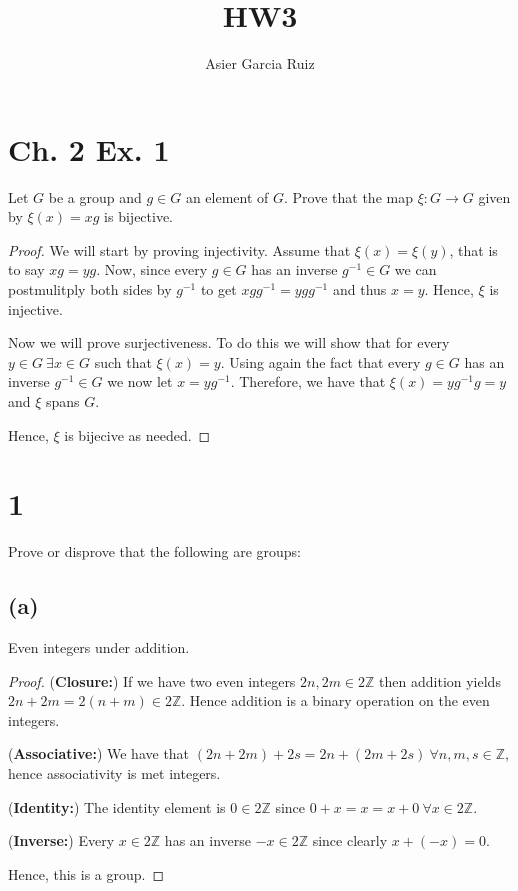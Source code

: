\documentclass{article}
\title{HW3}
\author{Asier Garcia Ruiz}
\newcommand{\Z}{\mathbb{Z}}
\begin{document}
\maketitle

\section*{Ch. 2 Ex. 1}
Let $G$ be a group and $g \in G$ an element of $G$. Prove that the map $\xi: G\to G$ given by $\xi(x) = xg$ is bijective.

\begin{proof}
    We will start by proving injectivity. Assume that $\xi(x) = \xi(y)$, that is to say
    $xg = yg$. Now, since every $g\in G$ has an inverse $g^{-1} \in G$ we can postmulitply
    both sides by $g^{-1}$ to get $xgg^{-1} = ygg^{-1}$ and thus $x=y$. Hence, $\xi$ is
    injective.

    Now we will prove surjectiveness. To do this we will show that for every
    $y \in G \ \exists x \in G$ such that $\xi(x) = y$. Using again the fact that every
    $g \in G$ has an inverse $g^{-1} \in G$ we now let $x = yg^{-1}$. Therefore, we have that
    $\xi(x) = yg^{-1}g = y$ and $\xi$ spans $G$.

    Hence, $\xi$ is bijecive as needed.
\end{proof}

\section*{1}
Prove or disprove that the following are groups:
\subsection*{(a)}
Even integers under addition.
\begin{proof}
    (\textbf{Closure:})
    If we have two even integers $2n, 2m \in 2\Z$ then addition yields
    $2n + 2m = 2(n + m) \in 2\Z$. Hence addition is a binary operation on the
    even integers.

    (\textbf{Associative:}) We have that $(2n + 2m) + 2s = 2n + (2m + 2s) \
        \forall n,m,s \in \Z$, hence associativity is met integers.

    (\textbf{Identity:}) The identity element is $0\in 2\Z$ since
    $0+ x = x = x + 0 \ \forall x \in 2\Z$.

    (\textbf{Inverse:}) Every $x \in 2\Z$ has an inverse $-x \in 2\Z$ since clearly $x + (-x) = 0$.

    Hence, this is a group.
\end{proof}
\end{document}
